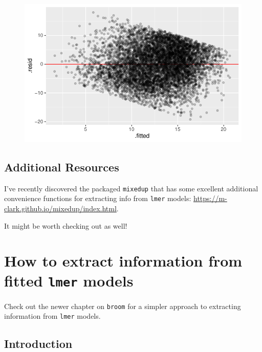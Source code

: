 \documentclass[
  letterpaper,
  DIV=11,
  numbers=noendperiod]{scrreprt}
\begin{document}
\begin{figure}[H]

{\centering \includegraphics{broom_files/figure-pdf/unnamed-chunk-12-2.pdf}

}

\end{figure}

\hypertarget{additional-resources}{%
\section{Additional Resources}\label{additional-resources}}

I've recently discovered the packaged \texttt{mixedup} that has some
excellent additional convenience functions for extracting info from
\texttt{lmer} models:
\url{https://m-clark.github.io/mixedup/index.html}.

It might be worth checking out as well!

\hypertarget{how-to-extract-information-from-fitted-lmer-models}{%
\chapter{\texorpdfstring{How to extract information from fitted
\texttt{lmer}
models}{How to extract information from fitted lmer models}}\label{how-to-extract-information-from-fitted-lmer-models}}

Check out the newer chapter on \texttt{broom} for a simpler approach to
extracting information from \texttt{lmer} models.

\hypertarget{introduction-3}{%
\section{Introduction}\label{introduction-3}}
\end{document}
